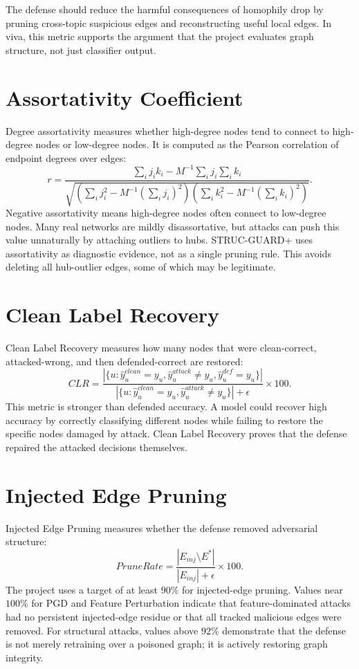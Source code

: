 \documentclass[12pt,oneside]{report}
\begin{document}
The defense should reduce the harmful consequences of homophily drop by pruning cross-topic suspicious edges and reconstructing useful local edges. In viva, this metric supports the argument that the project evaluates graph structure, not just classifier output.

\section{Assortativity Coefficient}
Degree assortativity measures whether high-degree nodes tend to connect to high-degree nodes or low-degree nodes. It is computed as the Pearson correlation of endpoint degrees over edges:
$$
r=\frac{\sum_i j_i k_i - M^{-1}\sum_i j_i\sum_i k_i}
{\sqrt{\left(\sum_i j_i^2-M^{-1}(\sum_i j_i)^2\right)
\left(\sum_i k_i^2-M^{-1}(\sum_i k_i)^2\right)}}.
$$
Negative assortativity means high-degree nodes often connect to low-degree nodes. Many real networks are mildly disassortative, but attacks can push this value unnaturally by attaching outliers to hubs. STRUC-GUARD+ uses assortativity as diagnostic evidence, not as a single pruning rule. This avoids deleting all hub-outlier edges, some of which may be legitimate.

\section{Clean Label Recovery}
Clean Label Recovery measures how many nodes that were clean-correct, attacked-wrong, and then defended-correct are restored:
$$
CLR=
\frac{|\{u:\hat{y}^{clean}_u=y_u,\hat{y}^{attack}_u\neq y_u,\hat{y}^{def}_u=y_u\}|}
{|\{u:\hat{y}^{clean}_u=y_u,\hat{y}^{attack}_u\neq y_u\}|+\epsilon}\times 100.
$$
This metric is stronger than defended accuracy. A model could recover high accuracy by correctly classifying different nodes while failing to restore the specific nodes damaged by attack. Clean Label Recovery proves that the defense repaired the attacked decisions themselves.

\section{Injected Edge Pruning}
Injected Edge Pruning measures whether the defense removed adversarial structure:
$$
PruneRate=\frac{|E_{inj}\setminus E^*|}{|E_{inj}|+\epsilon}\times 100.
$$
The project uses a target of at least $90\%$ for injected-edge pruning. Values near $100\%$ for PGD and Feature Perturbation indicate that feature-dominated attacks had no persistent injected-edge residue or that all tracked malicious edges were removed. For structural attacks, values above $92\%$ demonstrate that the defense is not merely retraining over a poisoned graph; it is actively restoring graph integrity.
\end{document}
